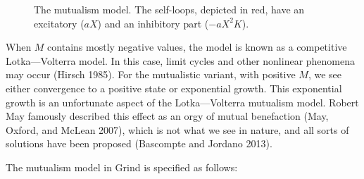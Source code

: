 \documentclass[
  a4paper,
  DIV=11,
  numbers=noendperiod,
  oneside]{scrreprt}
\begin{document}
\begin{figure}


\caption{\label{fig-ch6-img6-old-75}The mutualism model. The self-loops,
depicted in red, have an excitatory (\(aX\)) and an inhibitory part
(\(- aX^{2}K\)).}

\end{figure}%

When \(M\) contains mostly negative values, the model is known as a
competitive Lotka---Volterra model. In this case, limit cycles and other
nonlinear phenomena may occur (Hirsch 1985). For the mutualistic
variant, with positive \(M\), we see either convergence to a positive
state or exponential growth. This exponential growth is an unfortunate
aspect of the Lotka---Volterra mutualism model. Robert May famously
described this effect as an orgy of mutual benefaction (May, Oxford, and
McLean 2007), which is not what we see in nature, and all sorts of
solutions have been proposed (Bascompte and Jordano 2013).

The mutualism model in Grind is specified as follows:
\end{document}
